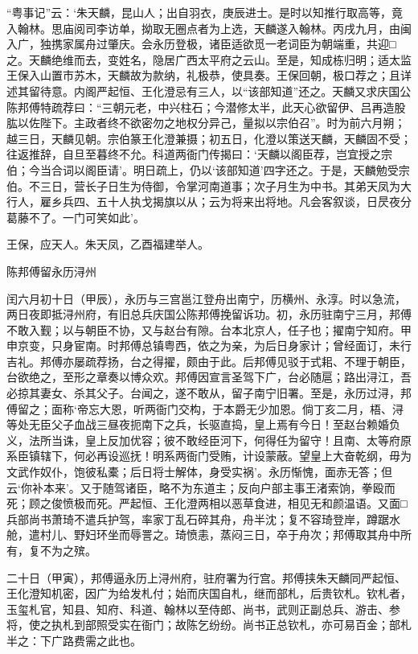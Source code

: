 \documentclass[]{article}
\begin{document}
``粤事记''云：`朱天麟，昆山人；出自羽衣，庚辰进士。是时以知推行取高等，竟入翰林。思庙阅司李访单，拗取无圈点者为上选，天麟遂入翰林。丙戌九月，由闽入广，独携家属舟过肇庆。会永历登极，诸臣适欲觅一老词臣为朝端重，共迎□之。天麟绝维而去，变姓名，隐居广西太平府之云山。至是，知成栋归明；适太监王保入山置市苏木，天麟故为款纳，礼极恭，使具奏。王保回朝，极口荐之；且详述其留待意。内阁严起恒、王化澄忌有三人，以``该部知道''还之。天麟又求庆国公陈邦傅特疏荐曰：``三朝元老，中兴柱石；今潜修太半，此天心欲留伊、吕再造股肱以佐陛下。主政者终不欲密勿之地权分异己，量拟以宗伯召''。时为前六月朔；越三日，天麟见朝。宗伯篆王化澄兼摄；初五日，化澄以策送天麟，天麟固不受；往返推辞，自旦至暮终不允。科道两衙门传揭曰：`天麟以阁臣荐，岂宜授之宗伯；今当合词以阁臣请'。明日疏上，仍以`该部知道'四字还之。于是，天麟勉受宗伯。不三日，营长子日生为侍御，令掌河南道事；次子月生为中书。其弟天凤为大行人，雇乡兵四、五十人执戈揭旗以从；云为将来出将地。凡会客叙谈，日昃夜分葛藤不了。一门可笑如此'。

王保，应天人。朱天凤，乙酉福建举人。

陈邦傅留永历浔州

闰六月初十日（甲辰），永历与三宫邕江登舟出南宁，历横州、永淳。时以急流，两日夜即抵浔州府，有旧总兵庆国公陈邦傅挽留诉功。初，永历驻南宁三月，邦傅不敢入觐；以与朝臣不协，又与赵台有隙。台本北京人，任子也；擢南宁知府。甲申京变，只身宦南。时邦傅总镇粤西，依之为亲，为后日身家计；曾经面订，未行吉礼。邦傅亦屡疏荐扬，台之得擢，颇由于此。后邦傅见驳于式耜、不理于朝臣，台欲绝之，至形之章奏以博众欢。邦傅因宣言圣驾下广，台必随扈；路出浔江，吾必掠其妻女、杀其父子。台闻之，遂不敢从，留子南宁旧署。至是，永历过浔，邦傅留之；面称`帝忘大恩，听两衙门交构，于本爵无少加恩。倘丁亥二月，梧、浔等处无臣父子血战三昼夜扼南下之兵，长驱直捣，皇上焉有今日！至赵台赖婚负义，法所当诛，皇上反加优容；彼不敢经臣河下，何得任为留守！且南、太等府原系臣镇辖下，何必再设巡抚！明系两衙门受贿，计设蒙蔽。望皇上大奋乾纲，毋为文武作奴仆，饱彼私橐；后日将士解体，身受实祸'。永历惭愧，面赤无答；但云`你补本来'。又于随驾诸臣，略不为东道主；反向户部主事王渚索饷，拳殴而死；顾之俊愤极而死。严起恒、王化澄两相以恶草食进，相见无和颜温语。又面□兵部尚书萧琦不遣兵护驾，率家丁乱石碎其舟，舟半沈；复不容琦登岸，蹲踞水舱，遣村儿、野妇环坐而辱詈之。琦愤恚，蒸闷三日，卒于舟次；邦傅取其舟中所有，复不为之殡。

二十日（甲寅），邦傅逼永历上浔州府，驻府署为行宫。邦傅挟朱天麟同严起恒、王化澄知机密，因广为给发札付；始而庆国自札，继而部札，后贵钦札。钦札者，玉玺札官，知县、知府、科道、翰林以至侍郎、尚书，武则正副总兵、游击、参将，使之执札到部照受实在衙门；故陈乞纷纷。尚书正总钦札，亦可易百金；部札半之：下广路费需之此也。
\end{document}

